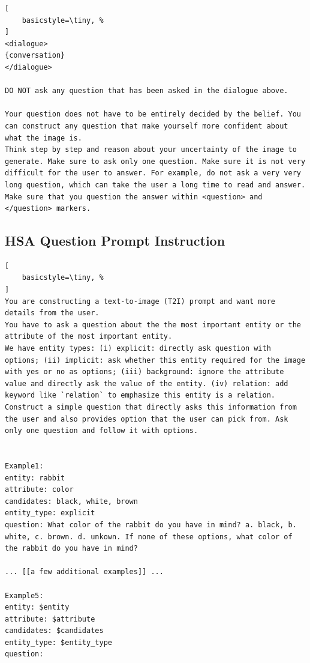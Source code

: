 \begin{lstlisting}[
    basicstyle=\tiny, %
]
<dialogue>
{conversation}
</dialogue>

DO NOT ask any question that has been asked in the dialogue above.

Your question does not have to be entirely decided by the belief. You can construct any question that make yourself more confident about what the image is. 
Think step by step and reason about your uncertainty of the image to generate. Make sure to ask only one question. Make sure it is not very difficult for the user to answer. For example, do not ask a very very long question, which can take the user a long time to read and answer.
Make sure that you question the answer within <question> and </question> markers. 
\end{lstlisting}


\subsection{HSA Question Prompt Instruction} \label{ssec:hsa_question}
\begin{lstlisting}[
    basicstyle=\tiny, %
]
You are constructing a text-to-image (T2I) prompt and want more details from the user.
You have to ask a question about the the most important entity or the attribute of the most important entity.
We have entity types: (i) explicit: directly ask question with options; (ii) implicit: ask whether this entity required for the image with yes or no as options; (iii) background: ignore the attribute value and directly ask the value of the entity. (iv) relation: add keyword like `relation` to emphasize this entity is a relation.
Construct a simple question that directly asks this information from the user and also provides option that the user can pick from. Ask only one question and follow it with options.


Example1:
entity: rabbit
attribute: color
candidates: black, white, brown
entity_type: explicit
question: What color of the rabbit do you have in mind? a. black, b. white, c. brown. d. unkown. If none of these options, what color of the rabbit do you have in mind?

... [[a few additional examples]] ...

Example5:
entity: $entity
attribute: $attribute
candidates: $candidates
entity_type: $entity_type
question: 
\end{lstlisting}





